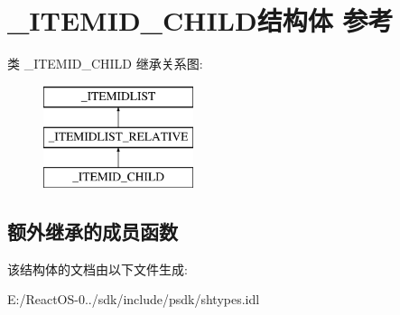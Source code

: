 \hypertarget{struct___i_t_e_m_i_d___c_h_i_l_d}{}\section{\+\_\+\+I\+T\+E\+M\+I\+D\+\_\+\+C\+H\+I\+L\+D结构体 参考}
\label{struct___i_t_e_m_i_d___c_h_i_l_d}
类 \+\_\+\+I\+T\+E\+M\+I\+D\+\_\+\+C\+H\+I\+LD 继承关系图\+:\begin{figure}[H]
\begin{center}
\leavevmode
\includegraphics[height=3.000000cm]{struct___i_t_e_m_i_d___c_h_i_l_d}
\end{center}
\end{figure}
\subsection*{额外继承的成员函数}


该结构体的文档由以下文件生成\+:\begin{DoxyCompactItemize}
\item 
E\+:/\+React\+O\+S-\/0../sdk/include/psdk/shtypes.\+idl\end{DoxyCompactItemize}
